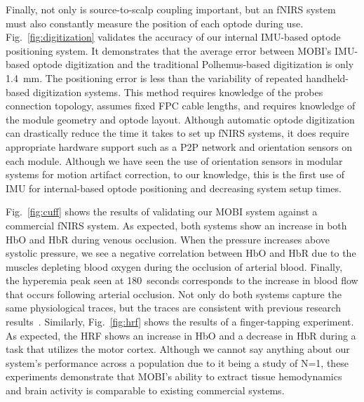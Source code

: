 Finally, not only is source-to-scalp coupling important, but an \ac{fNIRS} system must also constantly measure the position of each optode during use. Fig.~\ref{fig:digitization} validates the accuracy of our internal IMU-based optode positioning system. It demonstrates that the average error between \ac{MOBI}'s IMU-based optode digitization and the traditional Polhemus-based digitization is only 1.4~mm. The positioning error is less than the variability of repeated handheld-based digitization systems. This method requires knowledge of the probes connection topology, assumes fixed FPC cable lengths, and requires knowledge of the module geometry and optode layout. Although automatic optode digitization can drastically reduce the time it takes to set up \ac{fNIRS} systems, it does require appropriate hardware support such as a \ac{P2P} network and orientation sensors on each module. Although we have seen the use of orientation sensors in modular systems for motion artifact correction, to our knowledge, this is the first use of IMU for internal-based optode positioning and decreasing system setup times.

Fig.~\ref{fig:cuff} shows the results of validating our \ac{MOBI} system against a commercial \ac{fNIRS} system. As expected, both systems show an increase in both HbO and HbR during venous occlusion. When the pressure increases above systolic pressure, we see a negative correlation between HbO and HbR due to the muscles depleting blood oxygen during the occlusion of arterial blood. Finally, the hyperemia peak seen at 180~seconds corresponds to the increase in blood flow that occurs following arterial occlusion. Not only do both systems capture the same physiological traces, but the traces are consistent with previous research results~\cite{Liu2022}. Similarly, Fig.~\ref{fig:hrf} shows the results of a finger-tapping experiment. As expected, the HRF shows an increase in HbO and a decrease in HbR during a task that utilizes the motor cortex. Although we cannot say anything about our system's performance across a population due to it being a study of N=1, these experiments demonstrate that \ac{MOBI}'s ability to extract tissue hemodynamics and brain activity is comparable to existing commercial systems. 

